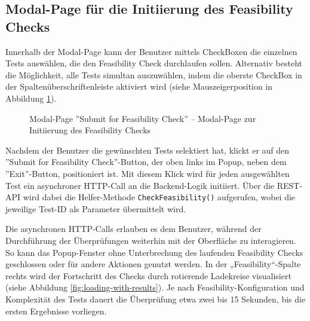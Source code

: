 \subsection{Modal-Page für die Initiierung des Feasibility Checks}

Innerhalb der Modal-Page kann der Benutzer mittels CheckBoxen die einzelnen Tests auswählen, die den Feasibility Check durchlaufen sollen. Alternativ besteht die Möglichkeit, alle Tests simultan auszuwählen, indem die oberste CheckBox in der Spaltenüberschriftenleiste aktiviert wird (siehe Mauszeigerposition in Abbildung \ref{fig:submit-page}).

\begin{figure}[!htbp] 
    \centering 
    \caption{Modal-Page ''Submit for Feasibility Check'' – Modal-Page zur Initiierung des Feasibility Checks} 
    \label{fig:submit-page} 
\end{figure}

Nachdem der Benutzer die gewünschten Tests selektiert hat, klickt er auf den ''Submit for Feasibility Check''-Button, der oben links im Popup, neben dem ''Exit''-Button, positioniert ist. Mit diesem Klick wird für jeden ausgewählten Test ein asynchroner HTTP-Call an die Backend-Logik initiiert. Über die REST-API wird dabei die Helfer-Methode \texttt{CheckFeasibility()} aufgerufen, wobei die jeweilige Test-ID als Parameter übermittelt wird.

Die asynchronen HTTP-Calls erlauben es dem Benutzer, während der Durchführung der Überprüfungen weiterhin mit der Oberfläche zu interagieren. So kann das Popup-Fenster ohne Unterbrechung des laufenden Feasibility Checks geschlossen oder für andere Aktionen genutzt werden. In der „Feasibility“-Spalte rechts wird der Fortschritt des Checks durch rotierende Ladekreise visualisiert (siehe Abbildung \ref{fig:loading-with-results}). Je nach Feasibility-Konfiguration und Komplexität des Tests dauert die Überprüfung etwa zwei bis 15 Sekunden, bis die ersten Ergebnisse vorliegen.


